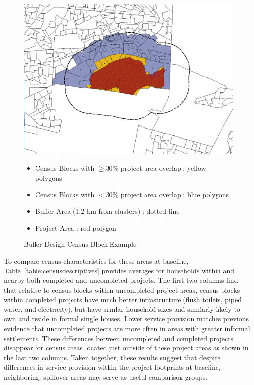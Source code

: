 \documentclass[12pt]{article}
\begin{document}
\begin{figure}
\caption{Buffer Design Census Block Example}\label{figure:bufferdesigncensus}
\centering
\includegraphics[scale=.4]{figures/design_7.png} 
\begin{itemize}
\item Census Blocks with $\geq$30\% project area overlap : yellow polygons 
\item Census Blocks with $<$30\% project area overlap : blue polygons
\item Buffer Area (1.2 km from clusters) : dotted line
\item Project Area : red polygon
\end{itemize}
\end{figure}

To compare census characteristics for these areas at baseline, Table~\ref{table:censusdescriptives} provides averages for households within and nearby both completed and uncompleted projects.  The first two columns find that relative to census blocks within uncompleted project areas, census blocks within completed projects have much better infrastructure (flush toilets, piped water, and electricity), but have similar household sizes and similarly likely to own and reside in formal single houses.  Lower service provision matches previous evidence that uncompleted projects are more often in areas with greater informal settlements.  These differences between uncompleted and completed projects disappear for census areas located just outside of these project areas as shown in the last two columns.  Taken together, these results suggest that despite differences in service provision within the project footprints at baseline, neighboring, spillover areas may serve as useful comparison groups.
\end{document}
